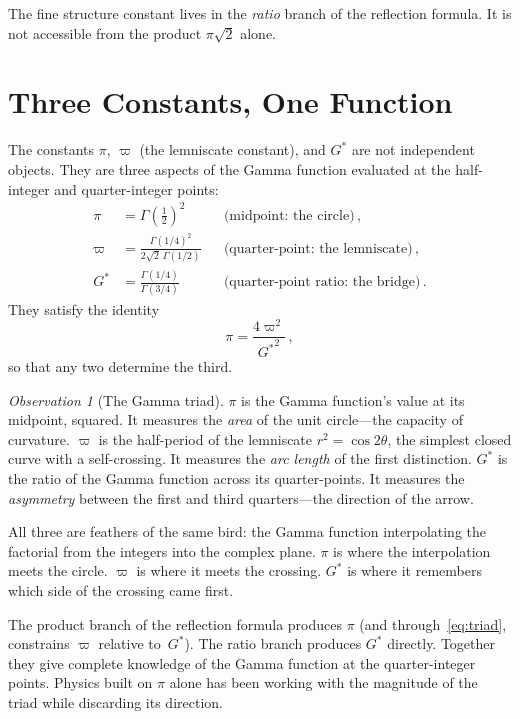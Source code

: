\documentclass[12pt,reqno]{amsart}
\theoremstyle{definition}
\theoremstyle{remark}
\newtheorem{observation}[theorem]{Observation}
\newcommand{\Gstar}{G^{\!*}}
\begin{document}
The fine structure constant lives in the \emph{ratio} branch of the reflection formula. It is not accessible from the product $\pi\sqrt{2}$ alone.

\section{Three Constants, One Function}

The constants $\pi$, $\varpi$ (the lemniscate constant), and $\Gstar$ are not independent objects. They are three aspects of the Gamma function evaluated at the half-integer and quarter-integer points:
\begin{align}
  \pi &= \Gamma\!\left(\tfrac{1}{2}\right)^2 &&\text{(midpoint: the circle)}\,,\\[4pt]
  \varpi &= \frac{\Gamma(1/4)^2}{2\sqrt{2}\,\Gamma(1/2)} &&\text{(quarter-point: the lemniscate)}\,,\\[4pt]
  \Gstar &= \frac{\Gamma(1/4)}{\Gamma(3/4)} &&\text{(quarter-point ratio: the bridge)}\,.
\end{align}
They satisfy the identity
\begin{equation}\label{eq:triad}
  \pi = \frac{4\varpi^2}{{G^*}^2}\,,
\end{equation}
so that any two determine the third.

\begin{observation}[The Gamma triad]
$\pi$ is the Gamma function's value at its midpoint, squared. It measures the \emph{area} of the unit circle---the capacity of curvature. $\varpi$ is the half-period of the lemniscate $r^2 = \cos 2\theta$, the simplest closed curve with a self-crossing. It measures the \emph{arc length} of the first distinction. $\Gstar$ is the ratio of the Gamma function across its quarter-points. It measures the \emph{asymmetry} between the first and third quarters---the direction of the arrow.

All three are feathers of the same bird: the Gamma function interpolating the factorial from the integers into the complex plane. $\pi$ is where the interpolation meets the circle. $\varpi$ is where it meets the crossing. $\Gstar$ is where it remembers which side of the crossing came first.
\end{observation}

The product branch of the reflection formula produces $\pi$ (and through~\eqref{eq:triad}, constrains $\varpi$ relative to~$\Gstar$). The ratio branch produces $\Gstar$ directly. Together they give complete knowledge of the Gamma function at the quarter-integer points. Physics built on $\pi$ alone has been working with the magnitude of the triad while discarding its direction.
\end{document}
